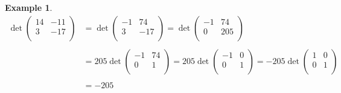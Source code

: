 \documentclass[11pt,a4paper]{article}
\theoremstyle{definition}
\newtheorem{exa}[thm]{Example}
\begin{document}
\begin{exa}
\begin{align*}
\det
\begin{pmatrix}
14&-11\\3&-17\\
\end{pmatrix}
&=\det
\begin{pmatrix}
-1&74\\3&-17\\
\end{pmatrix}
=\det
\begin{pmatrix}
-1&74\\0&205\\
\end{pmatrix}\\\\
&=205\det
\begin{pmatrix}
-1&74\\0&1\\
\end{pmatrix}
=205\det
\begin{pmatrix}
-1&0\\0&1\\
\end{pmatrix}
=-205\det
\begin{pmatrix}
1&0\\0&1\\
\end{pmatrix}\\\\
&=-205\\
\end{align*}
\end{exa}
\end{document}
